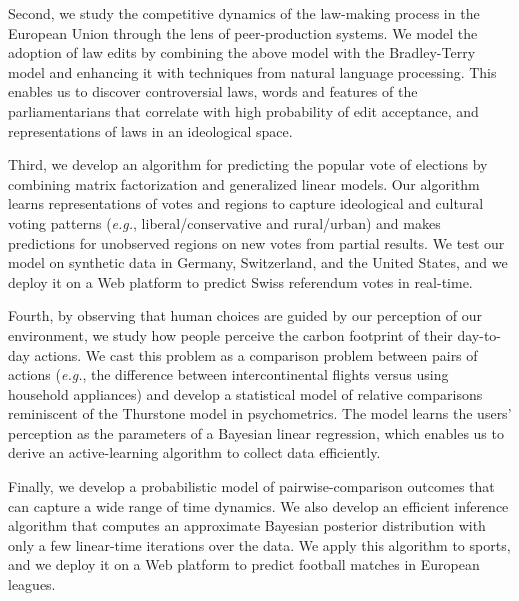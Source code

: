 Second, we study the competitive dynamics of the law-making process in the European Union through the lens of peer-production systems.
We model the adoption of law edits by combining the above model with the Bradley-Terry model and enhancing it with techniques from natural language processing.
This enables us to discover controversial laws, words and features of the parliamentarians that correlate with high probability of edit acceptance, and representations of laws in an ideological space.

Third, we develop an algorithm for predicting the popular vote of elections by combining matrix factorization and generalized linear models.
Our algorithm learns representations of votes and regions to capture ideological and cultural voting patterns (\textit{e.g.}, liberal/conservative and rural/urban) and makes predictions for unobserved regions on new votes from partial results.
We test our model on synthetic data in Germany, Switzerland, and the United States, and we deploy it on a Web platform to predict Swiss referendum votes in real-time.

Fourth, by observing that human choices are guided by our perception of our environment, we study how people perceive the carbon footprint of their day-to-day actions.
We cast this problem as a comparison problem between pairs of actions (\textit{e.g.}, the difference between intercontinental flights versus using household appliances) and develop a statistical model of relative comparisons reminiscent of the Thurstone model in psychometrics.
The model learns the users’ perception as the parameters of a Bayesian linear regression, which enables us to derive an active-learning algorithm to collect data efficiently.

Finally, we develop a probabilistic model of pairwise-comparison outcomes that can capture a wide range of time dynamics.
We also develop an efficient inference algorithm that computes an approximate Bayesian posterior distribution with only a few linear-time iterations over the data.
We apply this algorithm to sports, and we deploy it on a Web platform to predict football matches in European leagues.

